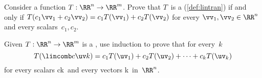 \begin{exercise}  
Consider a function \(T:\RR^n\to\RR^m\).  
Prove that \(T\)~is a  (\cref{def:lintran}) if and only if \(T(c_1\vv_1+c_2\vv_2)=c_1T(\vv_1)+c_2T(\vv_2)\) for every \(\vv_1,\vv_2\in\RR^n\) and every scalars~\(c_1,c_2\).
\end{exercise}



\begin{exercise} \label{ex:genlintran} 
Given \(T:\RR^n\to\RR^m\) is a , use induction to prove that for every~\(k\)
\begin{equation*}
T(\lincomb c\uv k)
=c_1T(\uv_1)+c_2T(\uv_2)+\cdots+c_kT(\uv_k)
\end{equation*}
for every scalars \hlist ck\ and every vectors \hlist \uv k\ in~\(\RR^n\).
\end{exercise}





